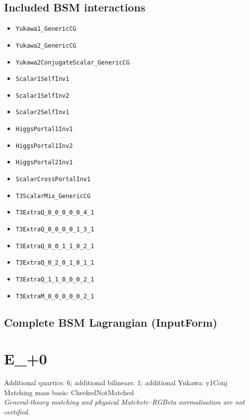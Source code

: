 \documentclass[10pt,a4paper]{article}
\begin{document}
\subsection*{Included BSM interactions}
\begin{itemize}
\item \texttt{Yukawa1\_GenericCG}
\item \texttt{Yukawa2\_GenericCG}
\item \texttt{Yukawa2ConjugateScalar\_GenericCG}
\item \texttt{Scalar1SelfInv1}
\item \texttt{Scalar1SelfInv2}
\item \texttt{Scalar2SelfInv1}
\item \texttt{HiggsPortal1Inv1}
\item \texttt{HiggsPortal1Inv2}
\item \texttt{HiggsPortal2Inv1}
\item \texttt{ScalarCrossPortalInv1}
\item \texttt{T3ScalarMix\_GenericCG}
\item \texttt{T3ExtraQ\_0\_0\_0\_0\_0\_4\_1}
\item \texttt{T3ExtraQ\_0\_0\_0\_0\_1\_3\_1}
\item \texttt{T3ExtraQ\_0\_0\_1\_1\_0\_2\_1}
\item \texttt{T3ExtraQ\_0\_2\_0\_1\_0\_1\_1}
\item \texttt{T3ExtraQ\_1\_1\_0\_0\_0\_2\_1}
\item \texttt{T3ExtraM\_0\_0\_0\_0\_0\_2\_1}
\end{itemize}
\subsection*{Complete BSM Lagrangian (InputForm)}

\clearpage
\section{E\_+0}
Additional quartics: 6; additional bilinears: 1; additional Yukawa: y1Conj\\
Matching mass basis: CheckedNotMatched\\
\emph{General-theory matching and physical Matchete--RGBeta normalisation are not certified.}
\end{document}

